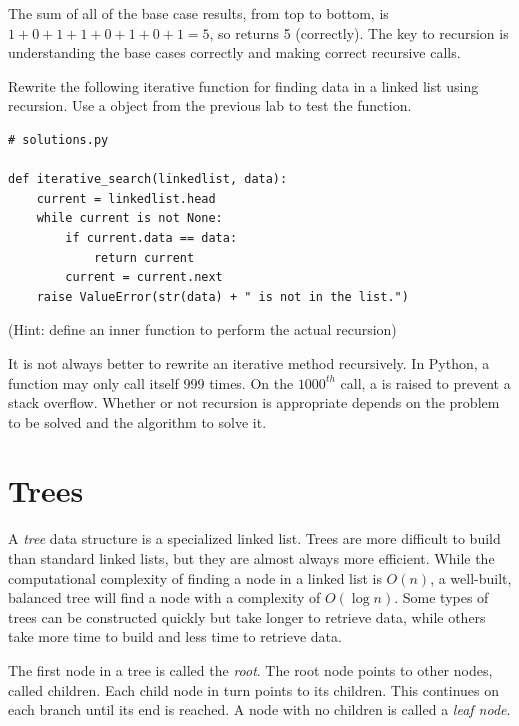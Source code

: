 The sum of all of the base case results, from top to bottom, is $1 + 0 + 1 + 1 + 0 + 1 + 0 + 1 = 5$, so  returns 5 (correctly).
The key to recursion is understanding the base cases correctly and making correct recursive calls.

\begin{problem}
Rewrite the following iterative function for finding data in a linked list using recursion.
Use a  object from the previous lab to test the function.
\begin{lstlisting}
# solutions.py

def iterative_search(linkedlist, data):
	current = linkedlist.head
	while current is not None:
		if current.data == data:
			return current
		current = current.next
	raise ValueError(str(data) + " is not in the list.")
\end{lstlisting}
(Hint: define an inner function to perform the actual recursion)
\end{problem}

\begin{warn}
It is not always better to rewrite an iterative method recursively.
In Python, a function may only call itself 999 times.
On the $1000^{th}$ call, a  is raised to prevent a stack overflow.
Whether or not recursion is appropriate depends on the problem to be solved and the algorithm to solve it.
\end{warn}

\section*{Trees}

A \emph{tree} data structure is a specialized linked list.
Trees are more difficult to build than standard linked lists, but they are almost always more efficient.
While the computational complexity of finding a node in a linked list is $O(n)$, a well-built, balanced tree will find a node with a complexity of $O(\log{n})$.
Some types of trees can be constructed quickly but take longer to retrieve data, while others take more time to build and less time to retrieve data.

The first node in a tree is called the \emph{root}.
The root node points to other nodes, called children.
Each child node in turn points to its children.
This continues on each branch until its end is reached.
A node with no children is called a \emph{leaf node}.


